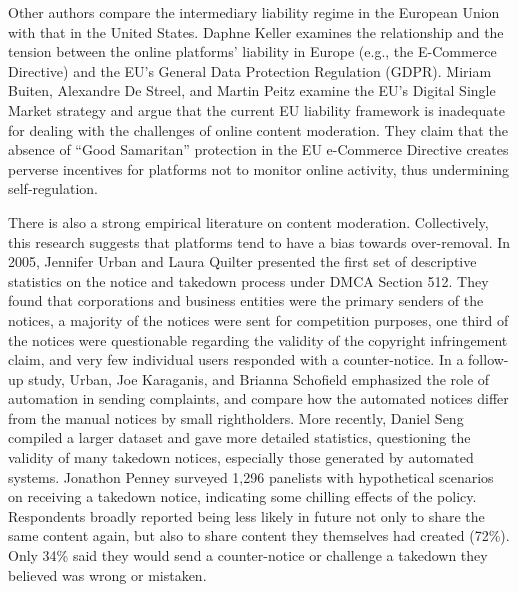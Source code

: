 Other authors compare the intermediary liability regime in the European Union with that in the United States. Daphne Keller examines the relationship and the tension between the online platforms' liability in Europe (e.g., the E-Commerce Directive) and the EU's General Data Protection Regulation (GDPR).
Miriam Buiten, Alexandre De Streel, and Martin Peitz examine the EU's Digital Single Market strategy and argue that the current EU liability framework is inadequate for dealing with the challenges of online content moderation. They claim that the absence of ``Good Samaritan'' protection in the EU e-Commerce Directive creates perverse incentives for platforms not to monitor online activity, thus undermining self-regulation. 

There is also a strong empirical literature on content moderation. Collectively, this research suggests that platforms tend to have a bias towards over-removal.  In 2005, Jennifer Urban and Laura Quilter presented the first set of descriptive statistics on the notice and takedown process under DMCA Section 512. They found that corporations and business entities were the primary senders of the notices, a majority of the notices were sent for competition purposes, one third of the notices were questionable regarding the validity of the copyright infringement claim, and very few individual users responded with a counter-notice. In a follow-up study, Urban, Joe Karaganis, and Brianna Schofield emphasized the role of automation in sending complaints, and compare how the automated notices differ from the manual notices by small rightholders. More recently, Daniel Seng compiled a larger dataset and gave more detailed statistics, questioning the validity of many takedown notices, especially those generated by automated systems. Jonathon Penney surveyed 1,296 panelists with hypothetical scenarios on receiving a takedown notice, indicating some chilling effects of the policy. Respondents broadly reported being less likely in future not only to share the same content again, but also to share content they themselves had created (72\%). Only 34\% said they would send a counter-notice or challenge a takedown they believed was wrong or mistaken. 

